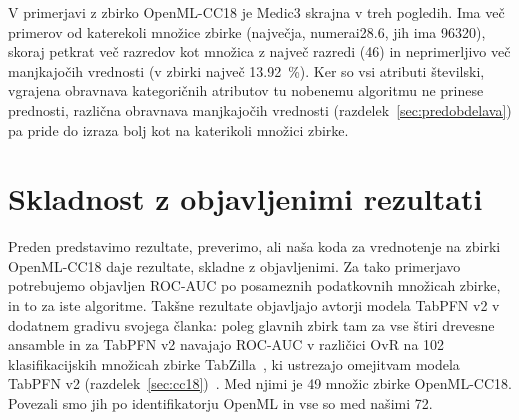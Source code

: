 \documentclass[a4paper,12pt,openright]{book}
\begin{document}
V primerjavi z zbirko OpenML-CC18 je Medic3 skrajna v treh pogledih. Ima več
primerov od katerekoli množice zbirke (največja, numerai28.6, jih ima
\num{96320}), skoraj petkrat več razredov kot množica z največ razredi (46) in
neprimerljivo več manjkajočih vrednosti (v zbirki največ \SI{13.92}{\percent}).
Ker so vsi atributi številski, vgrajena obravnava kategoričnih atributov tu
nobenemu algoritmu ne prinese prednosti, različna obravnava manjkajočih
vrednosti (razdelek~\ref{sec:predobdelava}) pa pride do izraza bolj kot na
katerikoli množici zbirke.

\section{Skladnost z objavljenimi rezultati}
\label{sec:cc18-literatura}

Preden predstavimo rezultate, preverimo, ali naša koda za vrednotenje na
zbirki OpenML-CC18 daje rezultate, skladne z objavljenimi. Za tako primerjavo
potrebujemo objavljen ROC-AUC po posameznih podatkovnih množicah zbirke, in to
za iste algoritme. Takšne rezultate objavljajo avtorji modela TabPFN v2 v
dodatnem gradivu svojega članka: poleg glavnih zbirk tam za vse štiri drevesne
ansamble in za TabPFN v2 navajajo ROC-AUC v različici OvR na 102 klasifikacijskih
množicah zbirke TabZilla~\cite{mcelfresh2023neural}, ki ustrezajo omejitvam
modela TabPFN v2 (razdelek~\ref{sec:cc18})~\cite{hollmann2025tabpfn}. Med njimi
je 49 množic zbirke OpenML-CC18. Povezali smo jih po identifikatorju OpenML in
vse so med našimi 72.
\end{document}
